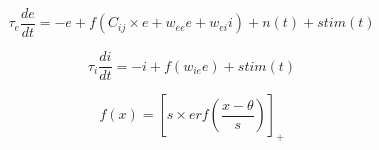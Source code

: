 \documentclass{article}
\begin{document}
\begin{equation}
\tau_{e} \frac{de}{dt} = -e + f(C_{ij} \times e + w_{ee}e + w_{ei}i) + n(t) + stim(t)
\end{equation}

\begin{equation}
\tau_{i} \frac{di}{dt} = -i + f(w_{ie}e) + stim(t)
\end{equation}

\begin{equation}
f(x) = [s \times erf(\frac{x-\theta}{s})]_{+}
\end{equation}
\end{document}
